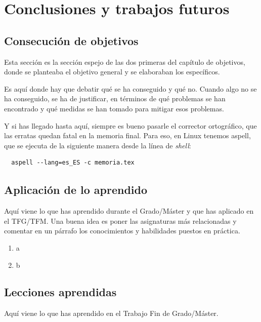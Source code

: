 \documentclass[a4paper, 12pt]{book}
\begin{document}
\chapter{Conclusiones y trabajos futuros}
\label{chap:conclusiones}


\section{Consecución de objetivos}
\label{sec:consecucion-objetivos}

Esta sección es la sección espejo de las dos primeras del capítulo de objetivos, donde se planteaba el objetivo general y se elaboraban los específicos.

Es aquí donde hay que debatir qué se ha conseguido y qué no. 
Cuando algo no se ha conseguido, se ha de justificar, en términos de qué problemas se han encontrado y qué medidas se han tomado para mitigar esos problemas.

Y si has llegado hasta aquí, siempre es bueno pasarle el corrector ortográfico, que las erratas quedan fatal en la memoria final.
Para eso, en Linux tenemos aspell, que se ejecuta de la siguiente manera desde la línea de \emph{shell}:

\begin{verbatim}
  aspell --lang=es_ES -c memoria.tex
\end{verbatim}

\section{Aplicación de lo aprendido}
\label{sec:aplicacion}

Aquí viene lo que has aprendido durante el Grado/Máster y que has aplicado en el TFG/TFM. Una buena idea es poner las asignaturas más relacionadas y comentar en un párrafo los conocimientos y habilidades puestos en práctica.

\begin{enumerate}
  \item a
  \item b
\end{enumerate}


\section{Lecciones aprendidas}
\label{sec:lecciones_aprendidas}

Aquí viene lo que has aprendido en el Trabajo Fin de Grado/Máster.
\end{document}
